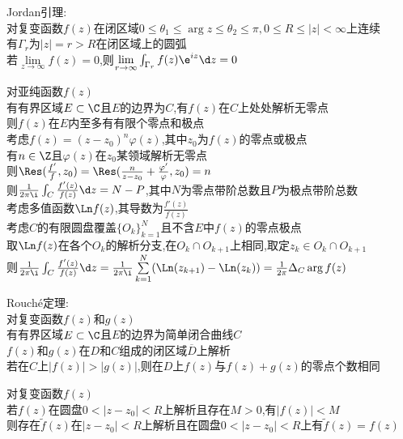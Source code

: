 \begin{dingli}
Jordan引理:\\
对复变函数$f(z)$在闭区域$0\leq\theta_1\leq \arg z\leq \theta_2\leq \pi,0\leq R\leq |z|<\infty$上连续\\
有$\Gamma_r$为$|z|=r>R$在闭区域上的圆弧\\
若$\lim\limits_{z\to\infty}f(z)=0$,则$\lim\limits_{r\to\infty}\int_{\Gamma_r}f(z)\e^{iz}\d z=0$
\end{dingli}

\begin{dingli}
对亚纯函数$f(z)$\\
有有界区域$E\subset \C$且$E$的边界为$C$,有$f(z)$在$C$上处处解析无零点\\
则$f(z)$在$E$内至多有有限个零点和极点\\
考虑$f(z)=(z-z_0)^n\varphi(z)$,其中$z_0$为$f(z)$的零点或极点\\
有$n\in\Z$且$\varphi(z)$在$z_0$某领域解析无零点\\
则$\Res(\frac{f'}{f},z_0)=\Res(\frac{n}{z-z_0}+\frac{\varphi'}{\varphi},z_0)=n$\\
则$\frac{1}{2\pi\i}\int_{C}\frac{f'(z)}{f(z)}\d z=N-P$,其中$N$为零点带阶总数且$P$为极点带阶总数\\
考虑多值函数$\Ln f(z)$,其导数为$\frac{f'(z)}{f(z)}$\\
考虑$C$的有限圆盘覆盖$\{O_k\}_{k=1}^{N}$且不含$E$中$f(z)$的零点极点\\
取$\Ln f(z)$在各个$O_k$的解析分支,在$O_{k}\cap O_{k+1}$上相同,取定$z_k\in O_{k}\cap O_{k+1}$\\
则$\frac{1}{2\pi\i}\int_{C}\frac{f'(z)}{f(z)}\d z=\frac{1}{2\pi\i}\sum\limits_{k=1}^{N}(\Ln(z_{k+1})-\Ln (z_{k}))=\frac{1}{2\pi}\Delta_C \arg f(z)$
\end{dingli}

\begin{dingli}
Rouché定理:\\
对复变函数$f(z)$和$g(z)$\\
有有界区域$E\subset\C$且$E$的边界为简单闭合曲线$C$\\
$f(z)$和$g(z)$在$D$和$C$组成的闭区域$\overline{D}$上解析\\
若在$C$上$|f(z)|>|g(z)|$,则在$D$上$f(z)$与$f(z)+g(z)$的零点个数相同
\end{dingli}

\begin{dingli}
对复变函数$f(z)$\\
若$f(z)$在圆盘$0<|z-z_0|<R$上解析且存在$M>0$,有$|f(z)|<M$\\
则存在$\widetilde{f}(z)$在$|z-z_0|<R$上解析且在圆盘$0<|z-z_0|<R$上有$\widetilde{f}(z)=f(z)$
\end{dingli}

